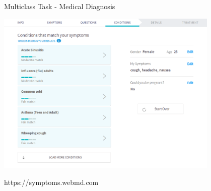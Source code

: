 \documentclass[11pt,compress,t,notes=noshow, xcolor=table]{beamer}
\begin{document}
\begin{vbframe}{Multiclass Task - Medical Diagnosis}
\begin{center}
  \includegraphics[width=0.8\textwidth]{figure_man/webmd.png}
\end{center}
\vspace{-0.5cm}
\begin{flushright}
  \tiny https://symptoms.webmd.com
\end{flushright}
\end{vbframe}
\end{document}
